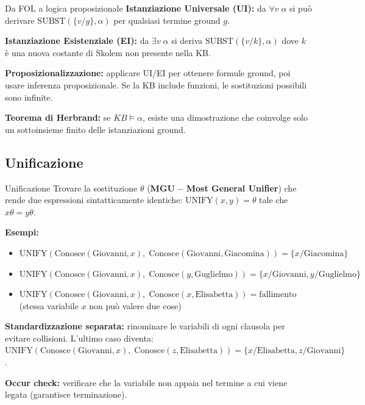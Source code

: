 \documentclass[12pt,a4paper]{article}
\begin{document}
\begin{defbox}{Da FOL a logica proposizionale}
\textbf{Istanziazione Universale (UI):} da $\forall v\; \alpha$ si può derivare $\text{SUBST}(\{v/g\}, \alpha)$ per qualsiasi termine ground $g$.

\textbf{Istanziazione Esistenziale (EI):} da $\exists v\; \alpha$ si deriva $\text{SUBST}(\{v/k\}, \alpha)$ dove $k$ è una nuova costante di Skolem non presente nella KB.

\textbf{Proposizionalizzazione:} applicare UI/EI per ottenere formule ground, poi usare inferenza proposizionale. Se la KB include funzioni, le sostituzioni possibili sono infinite.

\textbf{Teorema di Herbrand:} se $KB \models \alpha$, esiste una dimostrazione che coinvolge solo un sottoinsieme finito delle istanziazioni ground.
\end{defbox}

\subsection{Unificazione}

\begin{defbox}{Unificazione}
Trovare la sostituzione $\theta$ (\textbf{MGU -- Most General Unifier}) che rende due espressioni sintatticamente identiche: $\text{UNIFY}(x, y) = \theta$ tale che $x\theta = y\theta$.

\textbf{Esempi:}
\begin{itemize}[noitemsep]
  \item $\text{UNIFY}(\text{Conosce}(\text{Giovanni}, x),\; \text{Conosce}(\text{Giovanni}, \text{Giacomina})) = \{x/\text{Giacomina}\}$
  \item $\text{UNIFY}(\text{Conosce}(\text{Giovanni}, x),\; \text{Conosce}(y, \text{Guglielmo})) = \{x/\text{Giovanni}, y/\text{Guglielmo}\}$
  \item $\text{UNIFY}(\text{Conosce}(\text{Giovanni}, x),\; \text{Conosce}(x, \text{Elisabetta})) = \text{fallimento}$ (stessa variabile $x$ non può valere due cose)
\end{itemize}
\textbf{Standardizzazione separata:} rinominare le variabili di ogni clausola per evitare collisioni. L'ultimo caso diventa: $\text{UNIFY}(\text{Conosce}(\text{Giovanni}, x),\; \text{Conosce}(z, \text{Elisabetta})) = \{x/\text{Elisabetta}, z/\text{Giovanni}\}$.

\textbf{Occur check:} verificare che la variabile non appaia nel termine a cui viene legata (garantisce terminazione).
\end{defbox}
\end{document}
